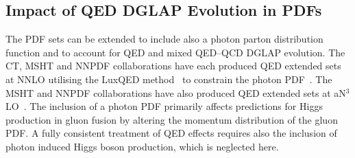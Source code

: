 
\subsection{Impact of QED DGLAP Evolution in PDFs}
\label{sec:ggf_qed_pdf}

\begin{table}[h!]
{\small
\centering
{}
}
\caption{
Impact of including QED DGLAP evolution in the individual and combination NNLO and aN$^3$LO PDFs sets on the N$^3$LO gluon fusion total cross section, for a Higgs boson mass of $\MH = 125.09$\,GeV.
}
\label{tab:ggf_pdf_qed}
\end{table}

The PDF sets can be extended to include also a photon parton distribution function and to account for QED and mixed QED--QCD DGLAP evolution.
The CT, MSHT and NNPDF collaborations have each produced QED extended sets at NNLO utilising the LuxQED method~\cite{Manohar:2016nzj,Manohar:2017eqh} to constrain the photon PDF~\cite{
Harland-Lang:2019pla,Xie:2021equ,Cridge:2021pxm,Cridge:2023ryv,
Bertone:2017bme,Barontini:2024dyb,NNPDF:2024djq}.
The MSHT and NNPDF collaborations have also produced QED extended sets at aN$^3$LO~\cite{Cridge:2023ryv,Barontini:2024dyb}.
The inclusion of a photon PDF primarily affects predictions for Higgs production in gluon fusion by altering the momentum distribution of the gluon PDF.
A fully consistent treatment of QED effects requires also the inclusion of photon induced Higgs boson production, which is neglected here.

